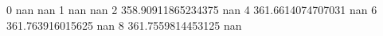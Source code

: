0 nan nan
1 nan nan
2 358.90911865234375 nan
4 361.6614074707031 nan
6 361.763916015625 nan
8 361.7559814453125 nan
